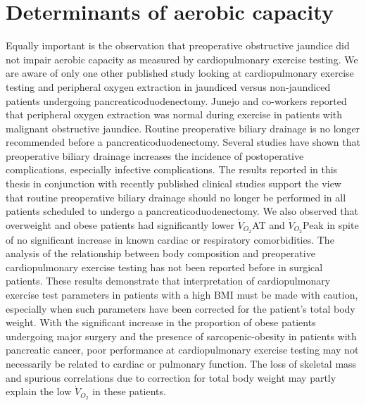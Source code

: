 \section{Determinants of aerobic capacity}
Equally important is the observation that preoperative obstructive jaundice did not impair aerobic capacity as measured by cardiopulmonary exercise testing. 
We are aware of only one other published study looking at cardiopulmonary exercise testing and peripheral oxygen extraction in jaundiced versus non-jaundiced patients undergoing pancreaticoduodenectomy. 
Junejo and co-workers reported that peripheral oxygen extraction was normal during exercise in patients with malignant obstructive jaundice.\parencite{junejo_peripheral_2014} 
Routine preoperative biliary drainage is no longer recommended before a pancreaticoduodenectomy. 
Several studies have shown that preoperative biliary drainage increases the incidence of postoperative complications, especially infective complications. \parencite{van_der_gaag_preoperative_2010, arkadopoulos_preoperative_2014, fujii_preoperative_2015, furukawa_negative_2015}
The results reported in this thesis in conjunction with recently published clinical studies support the view that routine preoperative biliary drainage should no longer be performed in all patients scheduled to undergo a pancreaticoduodenectomy.
We also observed that overweight and obese patients had significantly lower $\dot{V}_{O_2}$AT and $\dot{V}_{O_2}$Peak in spite of no significant increase in known cardiac or respiratory comorbidities. 
The analysis of the relationship between body composition and preoperative cardiopulmonary exercise testing has not been reported before in surgical patients. 
These results demonstrate that interpretation of cardiopulmonary exercise test parameters in patients with a high BMI must be made with caution, especially when such parameters have been corrected for the patient's total body weight. 
With the significant increase in the proportion of obese patients undergoing major surgery and the presence of sarcopenic-obesity in patients with pancreatic cancer, poor performance at cardiopulmonary exercise testing may not necessarily be related to cardiac or pulmonary function. 
The loss of skeletal mass and spurious correlations due to correction for total body weight may partly explain the low $\dot{V}_{O_2}$ in these patients. 

